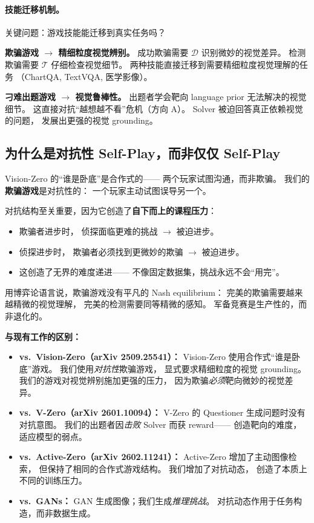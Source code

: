 \documentclass[12pt,a4paper]{article}
\begin{document}
\paragraph{技能迁移机制。}

关键问题：游戏技能能迁移到真实任务吗？

\textbf{欺骗游戏 $\rightarrow$ 精细粒度视觉辨别。}
成功欺骗需要 $\mathcal{D}$ 识别微妙的视觉差异。
检测欺骗需要 $\mathcal{T}$ 仔细检查视觉细节。
两种技能直接迁移到需要精细粒度视觉理解的任务
（ChartQA, TextVQA, 医学影像）。

\textbf{刁难出题游戏 $\rightarrow$ 视觉鲁棒性。}
出题者学会靶向 language prior 无法解决的视觉细节。
这直接对抗``越想越不看''危机（方向 A）。
Solver 被迫回答真正依赖视觉的问题，
发展出更强的视觉 grounding。

\subsection{为什么是对抗性 Self-Play，而非仅仅 Self-Play}

Vision-Zero 的``谁是卧底''是合作式的——
两个玩家试图沟通，而非欺骗。
我们的\textbf{欺骗游戏}是对抗性的：
一个玩家主动试图误导另一个。

对抗结构至关重要，因为它创造了\textbf{自下而上的课程压力}：
\begin{itemize}[leftmargin=2em]
  \item 欺骗者进步时，
    侦探面临更难的挑战 $\rightarrow$ 被迫进步。
  \item 侦探进步时，
    欺骗者必须找到更微妙的欺骗 $\rightarrow$ 被迫进步。
  \item 这创造了无界的难度递进——
    不像固定数据集，挑战永远不会``用完''。
\end{itemize}

用博弈论语言说，欺骗游戏没有平凡的 Nash equilibrium：
完美的欺骗需要越来越精微的视觉理解，
完美的检测需要同等精微的感知。
军备竞赛是生产性的，而非退化的。

\begin{relatedbox}
\textbf{与现有工作的区别：}
\begin{itemize}[leftmargin=1.5em]
  \item \textbf{vs.\ Vision-Zero（arXiv 2509.25541）：}
    Vision-Zero 使用合作式``谁是卧底''游戏。
    我们使用\textit{对抗性}欺骗游戏，
    显式要求精细粒度的视觉 grounding。
    我们的游戏对视觉辨别施加更强的压力，
    因为欺骗\textit{必须}靶向微妙的视觉差异。
  \item \textbf{vs.\ V-Zero（arXiv 2601.10094）：}
    V-Zero 的 Questioner 生成问题时没有对抗意图。
    我们的出题者因\textit{击败} Solver 而获 reward——
    创造靶向的难度，适应模型的弱点。
  \item \textbf{vs.\ Active-Zero（arXiv 2602.11241）：}
    Active-Zero 增加了主动图像检索，
    但保持了相同的合作式游戏结构。
    我们增加了对抗动态，
    创造了本质上不同的训练压力。
  \item \textbf{vs.\ GANs：}
    GAN 生成图像；我们生成\textit{推理挑战}。
    对抗动态作用于任务构造，而非数据生成。
\end{itemize}
\end{relatedbox}
\end{document}
